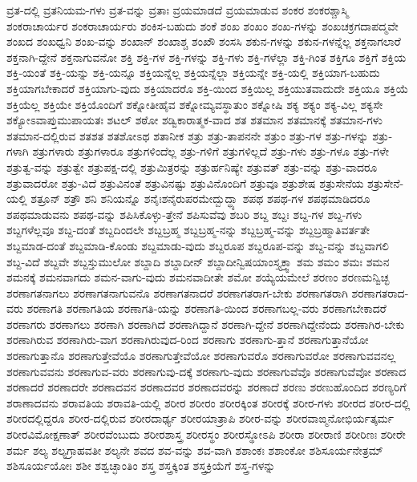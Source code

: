 {ವ್ರತ-ದಲ್ಲಿ
ವ್ರತನಿಯಮ-ಗಳು
ವ್ರತ-ವನ್ನು
ವ್ರತಾಃ
ವ್ರಯಮಾಡದೆ
ವ್ರಯಮಾಡುವ
ಶಂಕರ
ಶಂಕರಶ್ಚಾಸ್ಮಿ
ಶಂಕರಾಚಾರ್ಯರ
ಶಂಕರಾಚಾರ್ಯರು
ಶಂಕಿಸ-ಬಹುದು
ಶಂಕೆ
ಶಂಖ
ಶಂಖಂ
ಶಂಖ-ಗಳನ್ನು
ಶಂಖಚಕ್ರಗದಾಪದ್ಮವೇ
ಶಂಖದ
ಶಂಖಧ್ವನಿ
ಶಂಖ-ವನ್ನು
ಶಂಖಾನ್
ಶಂಖಾಶ್ಚ
ಶಂಖೌ
ಶಂಸಸಿ
ಶಕುನ-ಗಳನ್ನು
ಶಕುನ-ಗಳನ್ನೆಲ್ಲ
ಶಕ್ತನಾಗಲಾರೆ
ಶಕ್ತನಾಗಿ-ದ್ದೇನೆ
ಶಕ್ತನಾಗುವನೋ
ಶಕ್ತಿ
ಶಕ್ತಿ-ಗಳ
ಶಕ್ತಿ-ಗಳನ್ನು
ಶಕ್ತಿ-ಗಳು
ಶಕ್ತಿ-ಗಳೆಲ್ಲಾ
ಶಕ್ತಿ-ಗಿಂತ
ಶಕ್ತಿಗೂ
ಶಕ್ತಿಗೆ
ಶಕ್ತಿಯ
ಶಕ್ತಿ-ಯಂತೆ
ಶಕ್ತಿ-ಯನ್ನು
ಶಕ್ತಿ-ಯನ್ನೂ
ಶಕ್ತಿಯನ್ನೆಲ್ಲ
ಶಕ್ತಿಯನ್ನೆಲ್ಲಾ
ಶಕ್ತಿಯನ್ನೇ
ಶಕ್ತಿ-ಯಲ್ಲಿ
ಶಕ್ತಿಯಾಗ-ಬಹುದು
ಶಕ್ತಿಯಾಗಬೇಕಾದರೆ
ಶಕ್ತಿಯಾಗು-ವುದು
ಶಕ್ತಿಯಾದರೊ
ಶಕ್ತಿ-ಯಿಂದ
ಶಕ್ತಿಯಿಲ್ಲ
ಶಕ್ತಿಯುತವಾದುದೇ
ಶಕ್ತಿಯೂ
ಶಕ್ತಿಯೆ
ಶಕ್ತಿಯೆಲ್ಲ
ಶಕ್ತಿಯೇ
ಶಕ್ತಿಯೊಂದಿಗೆ
ಶಕ್ನೋತೀಹೈವ
ಶಕ್ನೋಮ್ಯವಸ್ಥಾತುಂ
ಶಕ್ನೋಷಿ
ಶಕ್ಯ
ಶಕ್ಯಂ
ಶಕ್ಯ-ವಿಲ್ಲ
ಶಕ್ಯಸೇ
ಶಕ್ಯೋಽವಾಪ್ತುಮುಪಾಯತಃ
ಶಟಲ್
ಶಠೋ
ಶಡ್ವಿಕಾರಾತ್ಮಕ-ವಾದ
ಶತ
ಶತಮಾನ
ಶತಮಾನಕ್ಕೆ
ಶತಮಾನ-ಗಳು
ಶತಮಾನ-ದಲ್ಲಿರುವ
ಶತಶತ
ಶತಶೋಽಥ
ಶತಾನೀಕ
ಶತ್ರು
ಶತ್ರು-ತಾಪನನೇ
ಶತ್ರುಂ
ಶತ್ರು-ಗಳ
ಶತ್ರು-ಗಳನ್ನು
ಶತ್ರು-ಗಳಾಗಿ
ಶತ್ರುಗಳಾರು
ಶತ್ರುಗಳಾರೂ
ಶತ್ರುಗಳಿಂದೆಲ್ಲ
ಶತ್ರು-ಗಳಿಗೆ
ಶತ್ರುಗಳಿಲ್ಲದೆ
ಶತ್ರು-ಗಳು
ಶತ್ರು-ಗಳೂ
ಶತ್ರು-ಗಳೇ
ಶತ್ರುತ್ವ-ವನ್ನು
ಶತ್ರುತ್ವೇ
ಶತ್ರುಪಕ್ಷ-ದಲ್ಲಿ
ಶತ್ರುಮಿತ್ರರನ್ನು
ಶತ್ರುರ್ಹನಿಷ್ಯೇ
ಶತ್ರುವತ್
ಶತ್ರು-ವನ್ನು
ಶತ್ರು-ವಾದರೂ
ಶತ್ರುವಾದರೋ
ಶತ್ರು-ವಿದೆ
ಶತ್ರುವಿನಂತೆ
ಶತ್ರುವಿನಷ್ಟು
ಶತ್ರುವಿನೊಂದಿಗೆ
ಶತ್ರುವೂ
ಶತ್ರುಶೇಷ
ಶತ್ರುಸೇನೆಯ
ಶತ್ರುಸೇನೆ-ಯಲ್ಲಿ
ಶತ್ರೂನ್
ಶತ್ರೌ
ಶನಿ
ಶನಿಯನ್ನೊ
ಶನೈಃಶನೈರುಪರಮೇದ್ಬುದ್ಧ್ಯಾ
ಶಪಥ
ಶಪಥ-ಗಳ
ಶಪಥಮಾಡಿದರೂ
ಶಪಥಮಾಡುವನು
ಶಪಥ-ವನ್ನು
ಶಪಿಸಿಕೊಳ್ಳು-ತ್ತೇನೆ
ಶಪಿಸುವೆವು
ಶಬರಿ
ಶಬ್ದ
ಶಬ್ದಃ
ಶಬ್ದ-ಗಳ
ಶಬ್ದ-ಗಳು
ಶಬ್ದಗಳೆಲ್ಲವೂ
ಶಬ್ದ-ದಂತೆ
ಶಬ್ದದಿಂದಲೇ
ಶಬ್ದಬ್ರಹ್ಮ
ಶಬ್ದಬ್ರಹ್ಮ-ನನ್ನು
ಶಬ್ದಬ್ರಹ್ಮ-ವನ್ನು
ಶಬ್ದಬ್ರಹ್ಮಾತಿವರ್ತತೇ
ಶಬ್ದಮಾಡ-ದಂತೆ
ಶಬ್ದಮಾಡಿ-ಕೊಂಡು
ಶಬ್ದಮಾಡು-ವುದು
ಶಬ್ದರೂಪ
ಶಬ್ದರೂಪ-ವನ್ನು
ಶಬ್ದ-ವನ್ನು
ಶಬ್ದವಾಗಲಿ
ಶಬ್ದ-ವಿದೆ
ಶಬ್ದವೇ
ಶಬ್ದಸ್ತುಮುಲೋ
ಶಬ್ದಾದಿ
ಶಬ್ದಾದೀನ್
ಶಬ್ದಾದೀನ್ವಿಷಯಾಂಸ್ತ್ಯಕ್ತ್ವಾ
ಶಮ
ಶಮಂ
ಶಮಃ
ಶಮನ
ಶಮನಕ್ಕೆ
ಶಮನವಾಗದು
ಶಮನ-ವಾಗು-ವುದು
ಶಮನವಾದೀತೇ
ಶಮೋ
ಶಯ್ಯೆಯಮೇಲೆ
ಶರಣಂ
ಶರಣಮನ್ವಿಚ್ಛ
ಶರಣಾಗತನಾಗಲು
ಶರಣಾಗತನಾಗುವನೊ
ಶರಣಾಗತನಾದರೆ
ಶರಣಾಗತರಾಗ-ಬೇಕು
ಶರಣಾಗತರಾಗಿ
ಶರಣಾಗತರಾದ-ವರು
ಶರಣಾಗತಿ
ಶರಣಾಗತಿಯ
ಶರಣಾಗತಿ-ಯನ್ನು
ಶರಣಾಗತಿ-ಯಿಂದ
ಶರಣಾಗಬಲ್ಲ-ವರು
ಶರಣಾಗಬೇಕಾದರೆ
ಶರಣಾಗರು
ಶರಣಾಗಲು
ಶರಣಾಗಿ
ಶರಣಾಗಿದೆ
ಶರಣಾಗಿದ್ದಾನೆ
ಶರಣಾಗಿ-ದ್ದೇನೆ
ಶರಣಾಗಿದ್ದೇನೆಂದು
ಶರಣಾಗಿರ-ಬೇಕು
ಶರಣಾಗಿರುವ
ಶರಣಾಗಿರು-ವಾಗ
ಶರಣಾಗಿರುವುದ-ರಿಂದ
ಶರಣಾಗು
ಶರಣಾಗು-ತ್ತಾನೆ
ಶರಣಾಗುತ್ತಾನೆಯೋ
ಶರಣಾಗುತ್ತಾನೊ
ಶರಣಾಗುತ್ತೇವೆಯೊ
ಶರಣಾಗುತ್ತೇವೆಯೋ
ಶರಣಾಗುವರೊ
ಶರಣಾಗುವರೋ
ಶರಣಾಗುವವನಲ್ಲ
ಶರಣಾಗುವವನು
ಶರಣಾಗುವ-ವರು
ಶರಣಾಗುವು-ದಕ್ಕೆ
ಶರಣಾಗು-ವುದು
ಶರಣಾಗುವೆವೊ
ಶರಣಾಗುವೆವೋ
ಶರಣಾದ
ಶರಣಾದರೆ
ಶರಣಾದರೇ
ಶರಣಾದವನ
ಶರಣಾದವರ
ಶರಣಾದವರನ್ನು
ಶರಣಾದೆ
ಶರಣು
ಶರಣುಹೊಂದಿದ
ಶರಣ್ಯರಿಗೆ
ಶರಾಣಾದವನು
ಶರಾವತಿಯ
ಶರಾವತಿ-ಯಲ್ಲಿ
ಶರೀರ
ಶರೀರಂ
ಶರೀರಕ್ಕಿಂತ
ಶರೀರಕ್ಕೆ
ಶರೀರ-ಗಳು
ಶರೀರದ
ಶರೀರ-ದಲ್ಲಿ
ಶರೀರದಲ್ಲಿದ್ದರೂ
ಶರೀರ-ದಲ್ಲಿರುವ
ಶರೀರದಾರ್ಢ್ಯ
ಶರೀರಯಾತ್ರಾಪಿ
ಶರೀರ-ವನ್ನು
ಶರೀರವಾಙ್ಮನೋಭಿರ್ಯತ್ಕರ್ಮ
ಶರೀರವಿಮೋಕ್ಷಣಾತ್
ಶರೀರವೆಂಬುದು
ಶರೀರಶಾಸ್ತ್ರ
ಶರೀರಸ್ಥಂ
ಶರೀರಸ್ಥೋಽಪಿ
ಶರೀರಾ
ಶರೀರಾಣಿ
ಶರೀರಿಣಃ
ಶರೀರೇ
ಶರ್ಮ
ಶಲ್ಯ
ಶಲ್ಯಗ್ರಾಹವತೀ
ಶಲ್ಯನೇ
ಶವದ
ಶವ-ವನ್ನು
ಶವ-ವಾಗಿ
ಶಶಾಂಕಃ
ಶಶಾಂಕೋ
ಶಶಿಸೂರ್ಯನೇತ್ರಮ್
ಶಶಿಸೂರ್ಯಯೋಃ
ಶಶೀ
ಶಶ್ವಚ್ಛಾಂತಿಂ
ಶಸ್ತ್ರ
ಶಸ್ತ್ರಕ್ಕಿಂತ
ಶಸ್ತ್ರಕ್ರಿಯೆಗೆ
ಶಸ್ತ್ರ-ಗಳನ್ನು
}
